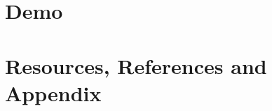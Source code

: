 \documentclass{article}
\begin{document}
\section{Demo}

\section{Resources, References and Appendix}
\end{document}

